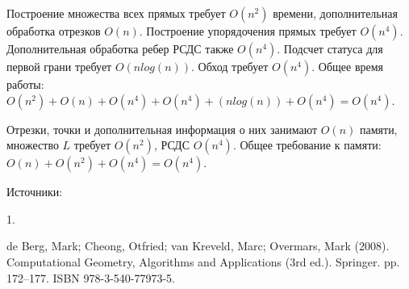 \documentclass[letterpaper,12pt]{article}
\begin{document}
Построение множества всех прямых требует $O(n^2)$ времени,
дополнительная обработка отрезков $O(n)$. Построение упорядочения прямых 
требует $O(n^4)$. Дополнительная обработка ребер РСДС также $O(n^4)$.
Подсчет статуса для первой грани требует $O(n log(n))$. Обход требует $O(n^4)$.
Общее время работы:
$O(n^2) + O(n) + O(n^4) + O(n^4) + (n log(n)) + O(n^4) = O(n^4)$.

Отрезки, точки и дополнительная информация о них занимают $O(n)$ памяти,
множество $L$ требует $O(n^2)$, РСДС $O(n^4)$.
Общее требование к памяти:
$O(n) + O(n^2) + O(n^4) = O(n^4)$.

\hspace{4em}

Источники:

\hypertarget{literature_1}{1.} de Berg, Mark; Cheong, Otfried; van Kreveld, Marc; Overmars, Mark (2008). 
Computational Geometry, Algorithms and Applications (3rd ed.). 
Springer. pp. 172–177. ISBN 978-3-540-77973-5.
\end{document}
